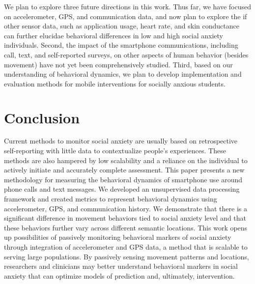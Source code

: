 We plan to explore three future directions in this work. Thus far, we have focused  on accelerometer, GPS, and communication data, and now plan to explore the if other  sensor data, such as application usage, heart rate, and skin conductance can further elucidae behavioral differences in low and high social anxiety individuals. Second, the impact of the smartphone communications, including call, text, and self-reported surveys, on other aspects of human behavior (besides movement) have not yet been comprehensively studied. Third, based on our understanding of behavioral dynamics, we plan to develop implementation and evaluation methods for mobile interventions for socially anxious students.

\section{Conclusion}
\label{sec:conclusion}
Current methods to monitor social anxiety are usually based on retrospective self-reporting with little data to contextualize people's experiences.  These methods are also hampered by low scalability and a reliance on the individual to actively initiate and accurately complete assessment. This paper presents a new methodology for measuring the behavioral dynamics of smartphone use around phone calls and text messages.  We developed an unsupervised data processing framework and created metrics to represent behavioral dynamics using accelerometer, GPS, and communication history. We demonstrate that there is a significant difference in movement behaviors tied to social anxiety level and that these behaviors further vary across different semantic locations.  This work opens up possibilities of passively monitoring behavioral markers of social anxiety through integration of accelerometer and GPS data, a method that is scalable to serving large populations.  By passively sensing movement patterns and locations, researchers and clinicians may better understand behavioral markers in social anxiety that can optimize models of prediction and, ultimately, intervention.
% 
% 

